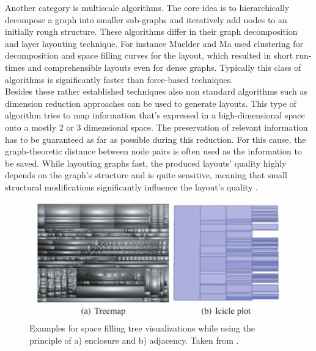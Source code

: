 Another category is multiscale algorithms. The core idea is to hierarchically decompose a graph into smaller sub-graphs and iteratively add nodes to an initially rough structure. These algorithms differ in their graph decomposition and layer layouting technique. For instance Muelder and Ma \cite{Muelder2008} used clustering for decomposition and space filling curves for the layout, which resulted in short run-times and comprehensible layouts even for dense graphs. Typically this class of algorithms is significantly faster than force-based techniques\cite{VonLandesberger2011}. \\
Besides these rather established techniques also non standard algorithms such as dimension reduction approaches can be used to generate layouts. This type of algorithm tries to map information that's expressed in a high-dimensional space onto a mostly 2 or 3 dimensional space. The preservation of relevant information has to be guaranteed as far as possible during this reduction. For this cause, the graph-theoretic distance between node pairs is often used as the information to be saved. While layouting graphs fast, the produced layouts' quality highly depends on the graph's structure and is quite sensitive, meaning that small structural modifications significantly influence the layout's quality \cite{Gibson2013} \cite{VonLandesberger2011}.

\begin{figure}
    \centering
    \includegraphics{media/space_filling_trees.pdf}
    \caption{Examples for space filling tree visualizations while using the principle of a) enclosure and b) adjacency. Taken from \cite{VonLandesberger2011}.}
    \label{fig:space_filling_trees}
\end{figure}

